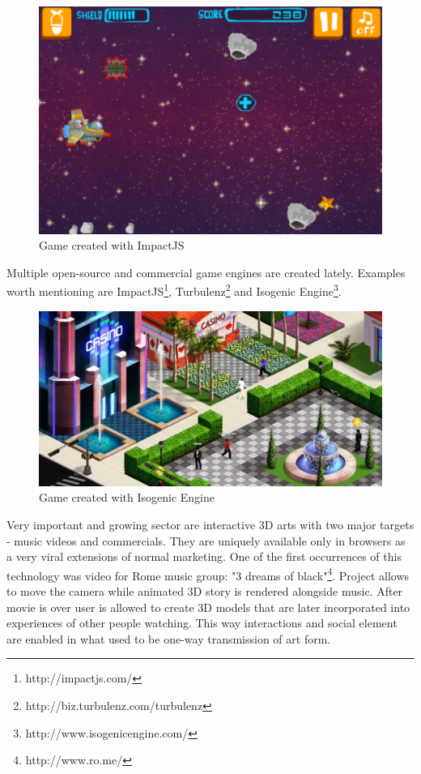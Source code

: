 \begin{figure}[h!]
  \caption{Game created with ImpactJS}
  \label{img:impactjs}
  \centering
	\includegraphics[width=12cm]{summary/impactjs.png}
\end{figure}

Multiple open-source and commercial game engines are created lately. Examples worth mentioning are ImpactJS\footnote{http://impactjs.com/}, Turbulenz\footnote{http://biz.turbulenz.com/turbulenz} and Isogenic Engine\footnote{http://www.isogenicengine.com/}.


\begin{figure}[h!]
  \caption{Game created with Isogenic Engine}
  \label{img:isogenic}
  \centering
	\includegraphics[width=12cm]{summary/isogenic.png}
\end{figure}

Very important and growing sector are interactive 3D arts with two major targets - music videos and commercials. They are uniquely available only in browsers as a very viral extensions of normal marketing. One of the first occurrences of this technology was video for Rome music group: "3 dreams of black"\footnote{http://www.ro.me/}. Project allows to move the camera while animated 3D story is rendered alongside music. After movie is over user is allowed to create 3D models that are later incorporated into experiences of other people watching. This way interactions and social element are enabled in what used to be one-way transmission of art form. 

